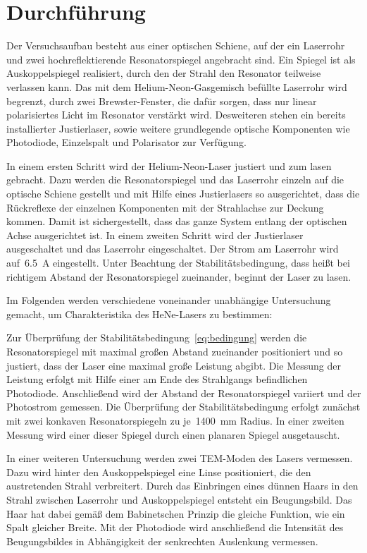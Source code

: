 \section{Durchführung}
\label{sec:durchführung}

Der Versuchsaufbau besteht aus einer optischen Schiene, auf der ein Laserrohr
und zwei hochreflektierende Resonatorspiegel angebracht sind. Ein Spiegel ist
als Auskoppelspiegel realisiert, durch den der Strahl den Resonator teilweise
verlassen kann. Das mit dem Helium-Neon-Gasgemisch befüllte Laserrohr wird
begrenzt, durch zwei Brewster-Fenster, die dafür sorgen, dass nur linear
polarisiertes Licht im Resonator verstärkt wird. Desweiteren stehen ein bereits
installierter Justierlaser, sowie weitere grundlegende optische Komponenten wie
Photodiode, Einzelspalt und Polarisator zur Verfügung.

In einem ersten Schritt wird der Helium-Neon-Laser justiert und zum lasen
gebracht. Dazu werden die Resonatorspiegel und das Laserrohr einzeln auf die
optische Schiene gestellt und mit Hilfe eines Justierlasers so ausgerichtet,
dass die Rückreflexe der einzelnen Komponenten mit der Strahlachse zur Deckung
kommen. Damit ist sichergestellt, dass das ganze System entlang der optischen
Achse ausgerichtet ist. In einem zweiten Schritt wird der Justierlaser
ausgeschaltet und das Laserrohr eingeschaltet. Der Strom am Laserrohr wird
auf~\SI{6.5}{\ampere} eingestellt. Unter Beachtung der Stabilitätsbedingung,
dass heißt bei richtigem Abstand der Resonatorspiegel zueinander, beginnt der
Laser zu lasen.

Im Folgenden werden verschiedene voneinander unabhängige Untersuchung gemacht,
um Charakteristika des HeNe-Lasers zu bestimmen:

Zur Überprüfung der Stabilitätsbedingung~\eqref{eq:bedingung} werden die
Resonatorspiegel mit maximal großen Abstand zueinander positioniert und so
justiert, dass der Laser eine maximal große Leistung abgibt. Die Messung der
Leistung erfolgt mit Hilfe einer am Ende des Strahlgangs befindlichen
Photodiode. Anschließend wird der Abstand der Resonatorspiegel variiert und der
Photostrom gemessen. Die Überprüfung der Stabilitätsbedingung erfolgt zunächst
mit zwei konkaven Resonatorspiegeln zu je~\SI{1400}{\milli\metre} Radius. In
einer zweiten Messung wird einer dieser Spiegel durch einen planaren Spiegel
ausgetauscht.

In einer weiteren Untersuchung werden zwei TEM-Moden des Lasers vermessen.
Dazu wird hinter den Auskoppelspiegel eine Linse positioniert, die den
austretenden Strahl verbreitert. Durch das Einbringen eines dünnen Haars in den
Strahl zwischen Laserrohr und Auskoppelspiegel entsteht ein Beugungsbild. Das
Haar hat dabei gemäß dem Babinetschen Prinzip die gleiche Funktion, wie ein
Spalt gleicher Breite. Mit der Photodiode wird anschließend die Intensität des
Beugungsbildes in Abhängigkeit der senkrechten Auslenkung vermessen.

